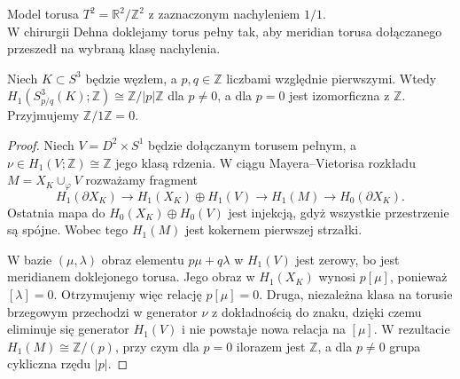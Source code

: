 \medskip
\begin{center}

{\footnotesize Model torusa $T^2=\mathbb R^2/\mathbb Z^2$ z zaznaczonym nachyleniem $1/1$. \\
W chirurgii Dehna doklejamy torus pełny tak, aby meridian torusa dołączanego \\
przeszedł na wybraną klasę nachylenia.}
\end{center}
\medskip

\begin{twierdzenie}
Niech $K\subset S^3$ będzie węzłem, a $p,q\in\mathbb Z$
liczbami względnie pierwszymi. Wtedy
$H_1(S^3_{p/q}(K);\mathbb Z)\cong\mathbb Z/|p|\mathbb Z$
dla $p\ne0$, a dla $p=0$ jest izomorficzna z $\mathbb Z$.
Przyjmujemy $\mathbb Z/1\mathbb Z=0$.
\end{twierdzenie}

\begin{proof}
Niech $V=D^2\times S^1$ będzie dołączanym torusem pełnym,
a $\nu\in H_1(V;\mathbb Z)\cong\mathbb Z$ jego klasą rdzenia.
W ciągu Mayera--Vietorisa rozkładu
$M=X_K\cup_\varphi V$ rozważamy fragment
\[
H_1(\partial X_K)\longrightarrow H_1(X_K)\oplus H_1(V)
\longrightarrow H_1(M)\longrightarrow
H_0(\partial X_K).
\]
Ostatnia mapa do $H_0(X_K)\oplus H_0(V)$ jest injekcją,
gdyż wszystkie przestrzenie są spójne. Wobec tego $H_1(M)$
jest kokernem pierwszej strzałki.

W bazie $(\mu,\lambda)$ obraz elementu $p\mu+q\lambda$
w $H_1(V)$ jest zerowy, bo jest meridianem doklejonego
torusa. Jego obraz w $H_1(X_K)$ wynosi $p[\mu]$,
ponieważ $[\lambda]=0$. Otrzymujemy więc relację
$p[\mu]=0$. Druga, niezależna klasa na torusie brzegowym
przechodzi w generator $\nu$ z dokładnością do znaku,
dzięki czemu eliminuje się generator $H_1(V)$ i nie
powstaje nowa relacja na $[\mu]$. W rezultacie
$H_1(M)\cong\mathbb Z/(p)$, przy czym dla $p=0$
ilorazem jest $\mathbb Z$, a dla $p\ne0$ grupa cykliczna
rzędu $|p|$.
\end{proof}

